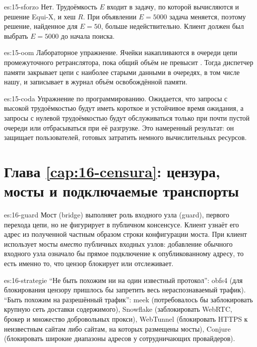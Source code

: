 \begin{soluzione}{es:15-sforzo}
Нет. Трудоёмкость $E$ входит в задачу, по которой вычисляются и решение Equi-X, и хеш $R$. При объявлении $E = 5000$ задача меняется, поэтому решение, найденное для $E = 50$, больше недействительно. Клиент должен был выбрать $E = 5000$ до начала поиска.
\end{soluzione}

\begin{soluzione}{es:15-oom}
Лабораторное упражнение. Ячейки накапливаются в очереди цепи промежуточного ретранслятора, пока общий объём не превысит . Тогда диспетчер памяти закрывает цепи с наиболее старыми данными в очередях, в том числе нашу, и записывает в журнал объём освобождённой памяти.
\end{soluzione}

\begin{soluzione}{es:15-coda}
Упражнение по программированию. Ожидается, что запросы с высокой трудоёмкостью будут иметь короткое и устойчивое время ожидания, а запросы с нулевой трудоёмкостью будут обслуживаться только при почти пустой очереди или отбрасываться при её разгрузке. Это намеренный результат: он защищает пользователей, готовых затратить немного вычислительных ресурсов.
\end{soluzione}

\section*{Глава \ref{cap:16-censura}: цензура, мосты и подключаемые транспорты}

\begin{soluzione}{es:16-guard}
Мост (bridge) выполняет роль входного узла (guard), первого перехода цепи, но не фигурирует в публичном консенсусе. Клиент узнаёт его адрес из полученной частным образом строки конфигурации моста. При  клиент использует мосты \emph{вместо} публичных входных узлов: добавление обычного входного узла означало бы прямое подключение к опубликованному адресу, то есть именно то, что цензор блокирует или отслеживает.
\end{soluzione}

\begin{soluzione}{es:16-strategie}
\enquote{Не быть похожим ни на один известный протокол}: obfs4 (для блокирования цензору пришлось бы запретить весь нераспознаваемый трафик). \enquote{Быть похожим на разрешённый трафик}: meek (потребовалось бы заблокировать крупную сеть доставки содержимого), Snowflake (заблокировать WebRTC, брокер и множество добровольных прокси), WebTunnel (блокировать HTTPS к неизвестным сайтам либо сайтам, на которых размещены мосты), Conjure (блокировать широкие диапазоны адресов у сотрудничающих провайдеров).
\end{soluzione}

